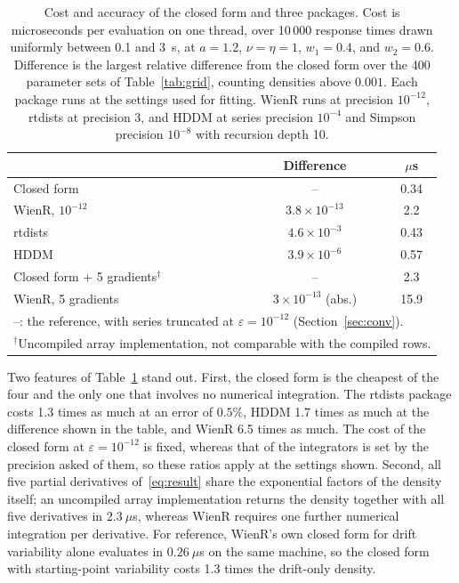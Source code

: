 \documentclass[final,5p,times,twocolumn,authoryear]{elsarticle}
\begin{document}
\begin{table}[t]
\centering
\caption{Cost and accuracy of the closed form and three packages. Cost is microseconds per evaluation on one thread, over 10\,000 response times drawn uniformly between 0.1 and 3~s, at $a = 1.2$, $\nu = \eta = 1$, $w_1 = 0.4$, and $w_2 = 0.6$. Difference is the largest relative difference from the closed form over the 400 parameter sets of Table~\ref{tab:grid}, counting densities above $0.001$. Each package runs at the settings used for fitting. WienR runs at precision $10^{-12}$, rtdists at precision 3, and HDDM at series precision $10^{-4}$ and Simpson precision $10^{-8}$ with recursion depth 10.}
\label{tab:timing}
\footnotesize
\begin{tabular}{lcc}
\toprule
 & Difference & $\mu$s \\
\midrule
Closed form   & --                 & 0.34 \\
WienR, $10^{-12}$ & $3.8\times10^{-13}$ & 2.2  \\
rtdists       & $4.6\times10^{-3}$ & 0.43 \\
HDDM          & $3.9\times10^{-6}$ & 0.57 \\
\midrule
Closed form $+$ 5 gradients$^{\dagger}$ & --      & 2.3  \\
WienR, 5 gradients           & $3\times10^{-13}$ (abs.) & 15.9 \\
\bottomrule
\multicolumn{3}{l}{--: the reference, with series truncated at $\varepsilon = 10^{-12}$ (Section~\ref{sec:conv}).}\\
\multicolumn{3}{l}{$^{\dagger}$Uncompiled array implementation, not comparable with the compiled rows.}
\end{tabular}
\end{table}

Two features of Table~\ref{tab:timing} stand out. First, the closed form is the cheapest of the four and the only one that involves no numerical integration. The rtdists package costs 1.3 times as much at an error of $0.5\%$, HDDM 1.7 times as much at the difference shown in the table, and WienR 6.5 times as much. The cost of the closed form at $\varepsilon = 10^{-12}$ is fixed, whereas that of the integrators is set by the precision asked of them, so these ratios apply at the settings shown. Second, all five partial derivatives of~\eqref{eq:result} share the exponential factors of the density itself; an uncompiled array implementation returns the density together with all five derivatives in $2.3~\mu$s, whereas WienR requires one further numerical integration per derivative. For reference, WienR's own closed form for drift variability alone \citep{Blurton2017} evaluates in $0.26~\mu$s on the same machine, so the closed form with starting-point variability costs 1.3 times the drift-only density.
\end{document}
